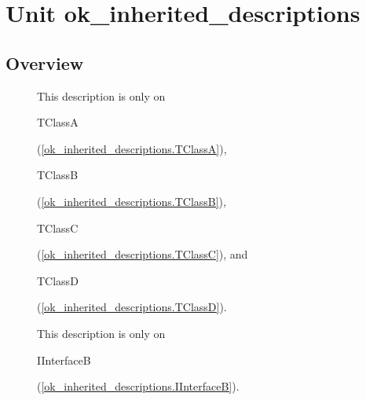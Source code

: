 \documentclass{report}
\begin{document}
\label{toc}\tableofcontents
\newpage
\newlength{\tmplength}
\chapter{Unit ok{\_}inherited{\_}descriptions}
\label{ok_inherited_descriptions}
\section{Overview}
\begin{description}
\item[\texttt{\begin{ttfamily}TClassA\end{ttfamily} Class}]This description is only on \begin{ttfamily}TClassA\end{ttfamily}(\ref{ok_inherited_descriptions.TClassA}), \begin{ttfamily}TClassB\end{ttfamily}(\ref{ok_inherited_descriptions.TClassB}), \begin{ttfamily}TClassC\end{ttfamily}(\ref{ok_inherited_descriptions.TClassC}), and \begin{ttfamily}TClassD\end{ttfamily}(\ref{ok_inherited_descriptions.TClassD}).
\item[\texttt{\begin{ttfamily}IInterfaceB\end{ttfamily} Interface}]This description is only on \begin{ttfamily}IInterfaceB\end{ttfamily}(\ref{ok_inherited_descriptions.IInterfaceB}).
\item[\texttt{\begin{ttfamily}TClassB\end{ttfamily} Class}]
\item[\texttt{\begin{ttfamily}IInterfaceC\end{ttfamily} Interface}]
\item[\texttt{\begin{ttfamily}TClassC\end{ttfamily} Class}]
\item[\texttt{\begin{ttfamily}TClassD\end{ttfamily} Class}]
\end{description}
\end{document}
